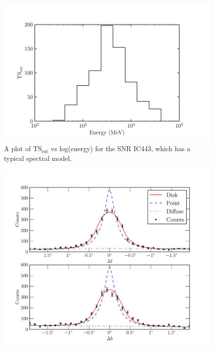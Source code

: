 \documentclass[preprint]{aastex}
\newcommand{\tsext}{{\ensuremath{\text{TS}_\text{ext}}}\xspace}
\begin{document}
\clearpage
\begin{figure}
  \begin{center}
    \includegraphics{ic443_plots/ic443_ts_ext_vs_energy.pdf}
    \caption{A plot of \tsext vs log(energy)
    for the SNR IC443, which has a typical spectral model.}
    \label{ts_ext_vs_energy}
  \end{center}
\end{figure}

\clearpage
\begin{figure}
  \begin{center}
    \includegraphics{ic443_plots/ic443_counts_slice.pdf}
    \caption{
    }
    \label{counts_slice}
  \end{center}
\end{figure}
\end{document}
